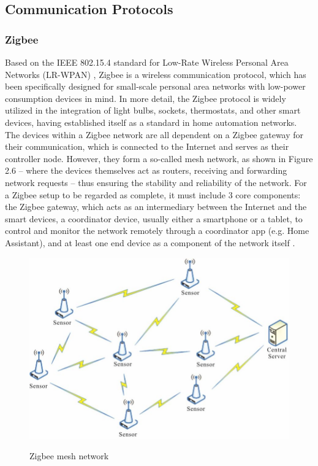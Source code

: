 \subsection{Communication Protocols}
\subsubsection{Zigbee}
Based on the IEEE 802.15.4 standard for Low-Rate Wireless Personal Area Networks (LR-WPAN) \cite{ieee802154}, Zigbee is a wireless communication protocol, which has been specifically designed for small-scale personal area networks with low-power consumption devices in mind. In more detail, the Zigbee protocol is widely utilized in the integration of light bulbs, sockets, thermostats, and other smart devices, having established itself as a standard in home automation networks.\\
The devices within a Zigbee network are all dependent on a Zigbee gateway for their communication, which is connected to the Internet and serves as their controller node. However, they form a so-called mesh network, as shown in Figure 2.6 -- where the devices themselves act as routers, receiving and forwarding network requests -- thus ensuring the stability and reliability of the network. For a Zigbee setup to be regarded as complete, it must include 3 core components: the Zigbee gateway, which acts as an intermediary between the Internet and the smart devices, a coordinator device, usually either a smartphone or a tablet, to control and monitor the network remotely through a coordinator app (e.g. Home Assistant), and at least one end device as a component of the network itself \cite{zigbee_watt24}.

\begin{figure}[H]
	\centering
	\includegraphics[width=0.5 \linewidth]{Images/ZigBee-mesh-network.jpg}
	\caption{Zigbee mesh network}
	\label{fig:Zigbee_Mesh}
    \cite{zigbee_mesh_network_article}
\end{figure}

